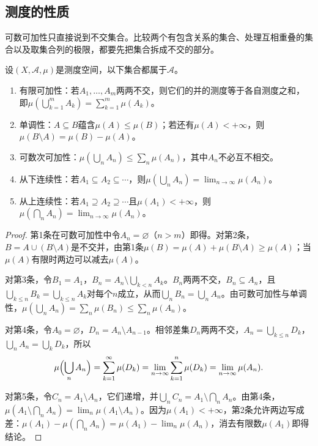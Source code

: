 \subsection{测度的性质}
\label{sec:measure-properties}

可数可加性只直接说到不交集合。比较两个有包含关系的集合、处理互相重叠的集合以及取集合列的极限，都要先把集合拆成不交的部分。

\begin{theorem}[测度的基本性质]
\label{thm:measure-basic-properties}
设$(X,\mathcal A,\mu)$是测度空间，以下集合都属于$\mathcal A$。
\begin{enumerate}
 \item 有限可加性：若$A_1,\dots,A_m$两两不交，则它们的并的测度等于各自测度之和，即$\mu(\bigcup_{k=1}^mA_k)=\sum_{k=1}^m\mu(A_k)$。
 \item 单调性：$A\subseteq B$蕴含$\mu(A)\le\mu(B)$；若还有$\mu(A)<+\infty$，则$\mu(B\setminus A)=\mu(B)-\mu(A)$。
 \item 可数次可加性：$\mu(\bigcup_nA_n)\le\sum_n\mu(A_n)$，其中$A_n$不必互不相交。
 \item 从下连续性：若$A_1\subseteq A_2\subseteq\cdots$，则$\mu(\bigcup_nA_n)=\lim_{n\to\infty}\mu(A_n)$。
 \item 从上连续性：若$A_1\supseteq A_2\supseteq\cdots$且$\mu(A_1)<+\infty$，则$\mu(\bigcap_nA_n)=\lim_{n\to\infty}\mu(A_n)$。
\end{enumerate}
\end{theorem}

\begin{proof}
第1条在可数可加性中令$A_n=\varnothing$（$n>m$）即得。对第2条，$B=A\cup(B\setminus A)$是不交并，由第1条$\mu(B)=\mu(A)+\mu(B\setminus A)\ge\mu(A)$；当$\mu(A)$有限时两边可以减去$\mu(A)$。

对第3条，令$B_1=A_1$，$B_n=A_n\setminus\bigcup_{k<n}A_k$。$B_n$两两不交，$B_n\subseteq A_n$，且$\bigcup_{k\le n}B_k=\bigcup_{k\le n}A_k$对每个$n$成立，从而$\bigcup_nB_n=\bigcup_nA_n$。由可数可加性与单调性，$\mu(\bigcup_nA_n)=\sum_n\mu(B_n)\le\sum_n\mu(A_n)$。

对第4条，令$A_0=\varnothing$，$D_n=A_n\setminus A_{n-1}$。相邻差集$D_n$两两不交，$A_n=\bigcup_{k\le n}D_k$，$\bigcup_nA_n=\bigcup_kD_k$，所以
\[
 \mu\Bigl(\bigcup_nA_n\Bigr)=\sum_{k=1}^{\infty}\mu(D_k)=\lim_{n\to\infty}\sum_{k=1}^n\mu(D_k)=\lim_{n\to\infty}\mu(A_n).
\]

对第5条，令$C_n=A_1\setminus A_n$，它们递增，并$\bigcup_nC_n=A_1\setminus\bigcap_nA_n$。由第4条，$\mu(A_1\setminus\bigcap_nA_n)=\lim_n\mu(A_1\setminus A_n)$。因为$\mu(A_1)<+\infty$，第2条允许两边写成差：$\mu(A_1)-\mu(\bigcap_nA_n)=\mu(A_1)-\lim_n\mu(A_n)$，消去有限数$\mu(A_1)$即得结论。
\end{proof}

